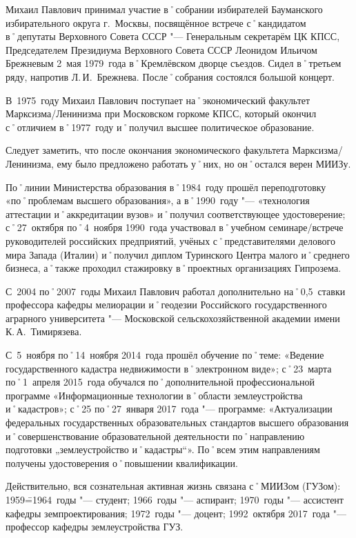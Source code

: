 Михаил Павлович принимал участие в˚собрании избирателей Бауманского избирательного округа г.~Москвы, посвящённое встрече с˚кандидатом в˚депутаты Верховного Совета СССР "--- Генеральным секретарём ЦК КПСС, Председателем Президиума Верховного Совета СССР Леонидом Ильичом Брежневым 2~мая 1979~года в˚Кремлёвском дворце съездов. Сидел в˚третьем ряду, напротив Л.\,И.~Брежнева. После˚собрания состоялся большой концерт. 

В~1975~году Михаил Павлович поступает на˚экономический факультет Марксизма\-/Ленинизма при Московском горкоме КПСС, который окончил с˚отличием в˚1977~году и˚получил высшее политическое образование.

Следует заметить, что после окончания экономического факультета Марксизма\-/Ленинизма, ему было предложено работать у˚них, но он˚остался верен МИИЗу.

По˚линии Министерства образования в˚1984~году прошёл переподготовку «по˚проблемам высшего образования», а в˚1990~году "--- «технология аттестации и˚аккредитации вузов» и˚получил соответствующее удостоверение; с˚27~октября по˚4~ноября 1990~года участвовал в˚учебном семинаре\-/встрече руководителей российских предприятий, учёных с˚представителями делового мира Запада (Италии) и˚получил диплом Туринского Центра малого и˚среднего бизнеса, а˚также проходил стажировку в˚проектных организациях Гипрозема.

С~2004 по˚2007~годы Михаил Павлович работал дополнительно на˚0,5~ставки профессора кафедры мелиорации и˚геодезии Российского государственного аграрного университета "--- Московской сельскохозяйственной академии имени К.\,А.~Тимирязева.

С~5~ноября по˚14~ноября 2014~года прошёл обучение по˚теме: «Ведение государственного кадастра недвижимости в˚электронном виде»; с˚23~марта по˚1~апреля 2015~года обучался по˚дополнительной профессиональной программе «Информационные технологии в˚области землеустройства и˚кадастров»; с˚25 по˚27~января 2017~года "--- программе: «Актуализации федеральных государственных образовательных стандартов высшего образования и˚совершенствование образовательной деятельности по˚направлению подготовки „землеустройство и˚кадастры“». По˚всем этим направлениям получены удостоверения о˚повышении квалификации. 

Действительно, вся сознательная активная жизнь связана с˚МИИЗом (ГУЗом): 1959\==1964~годы "--- студент; 1966~годы "--- аспирант; 1970~годы "--- ассистент кафедры земпроектирования; 1972~годы "--- доцент; 1992~октября 2017~года "--- профессор кафедры землеустройства ГУЗ.

